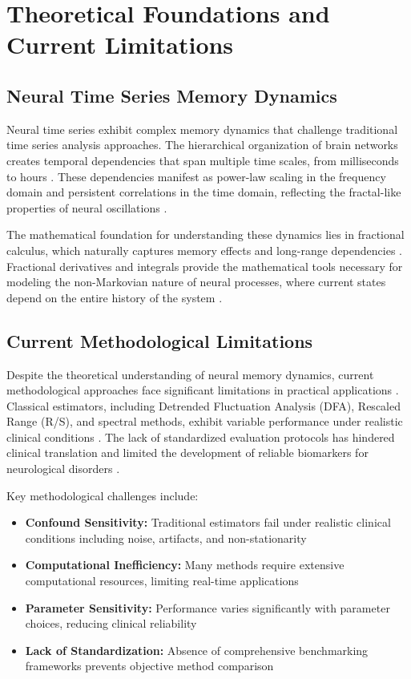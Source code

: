 \section{Theoretical Foundations and Current Limitations}

\subsection{Neural Time Series Memory Dynamics}

Neural time series exhibit complex memory dynamics that challenge traditional time series analysis approaches. The hierarchical organization of brain networks creates temporal dependencies that span multiple time scales, from milliseconds to hours \citep{VanDenHeuvel2010}. These dependencies manifest as power-law scaling in the frequency domain and persistent correlations in the time domain, reflecting the fractal-like properties of neural oscillations \citep{Marasco2012}.

The mathematical foundation for understanding these dynamics lies in fractional calculus, which naturally captures memory effects and long-range dependencies \citep{Bouteiller2011}. Fractional derivatives and integrals provide the mathematical tools necessary for modeling the non-Markovian nature of neural processes, where current states depend on the entire history of the system \citep{Lytton2017}.

\subsection{Current Methodological Limitations}

Despite the theoretical understanding of neural memory dynamics, current methodological approaches face significant limitations in practical applications \citep{Harris2020}. Classical estimators, including Detrended Fluctuation Analysis (DFA), Rescaled Range (R/S), and spectral methods, exhibit variable performance under realistic clinical conditions \citep{Virtanen2020}. The lack of standardized evaluation protocols has hindered clinical translation and limited the development of reliable biomarkers for neurological disorders \citep{McKinney2010}.

Key methodological challenges include:
\begin{itemize}
    \item \textbf{Confound Sensitivity:} Traditional estimators fail under realistic clinical conditions including noise, artifacts, and non-stationarity
    \item \textbf{Computational Inefficiency:} Many methods require extensive computational resources, limiting real-time applications
    \item \textbf{Parameter Sensitivity:} Performance varies significantly with parameter choices, reducing clinical reliability
    \item \textbf{Lack of Standardization:} Absence of comprehensive benchmarking frameworks prevents objective method comparison
\end{itemize}

